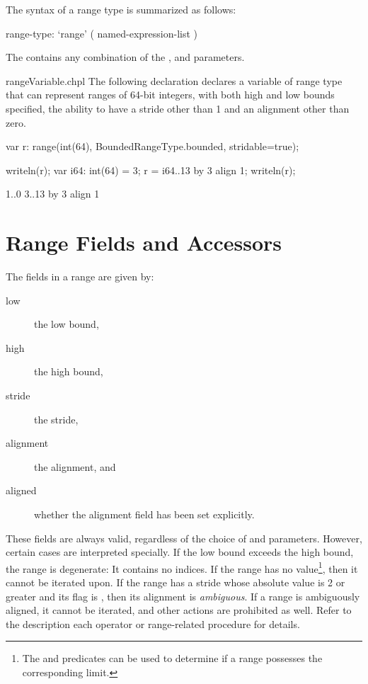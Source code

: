 The syntax of a range type is summarized as follows:
\begin{syntax}
range-type:
  `range' ( named-expression-list )
\end{syntax}
\noindent The  contains any combination of
  the ,  and  parameters.

\begin{chapelexample}{rangeVariable.chpl}
The following declaration declares a variable 
of range type that can represent ranges of 64-bit integers, with both
high and low bounds specified, the ability to have a stride other
than 1 and an alignment other than zero.
\begin{chapel}
var r: range(int(64), BoundedRangeType.bounded, stridable=true);
\end{chapel}
\begin{chapelpost}
writeln(r);
var i64: int(64) = 3;
r = i64..13 by 3 align 1;
writeln(r);
\end{chapelpost}
\begin{chapeloutput}
1..0
3..13 by 3 align 1
\end{chapeloutput}
\end{chapelexample}

\section{Range Fields and Accessors}
\label{Range_Fields}

The fields in a range are given by:
\begin{description}
\item[low] the low bound,
\item[high] the high bound,
\item[stride] the stride,
\item[alignment] the alignment, and
\item[aligned] whether the alignment field has been set explicitly.
\end{description}
These fields are always valid, regardless of the choice of 
and  parameters.  However, certain cases are interpreted
specially.  If the low bound exceeds the high bound, the range is degenerate: It contains no
indices.  If the range has no  value\footnote{The 
and  predicates can be used to determine if a range possesses the
corresponding limit.}, then it cannot be iterated
upon.  If the range has a stride whose absolute value
is 2 or greater and its  flag is , then its alignment is
\emph{ambiguous}.  If a range is ambiguously aligned, it cannot be iterated, and
other actions are prohibited as well.  Refer to the description each operator or
range-related procedure for details.

